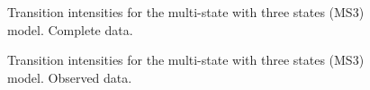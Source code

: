  \begin{figure}[h!]
\centering

\caption{Transition intensities for the multi-state with three states (MS3) model. Complete data.}
\label{fig:trans_complete}
\end{figure}

 \begin{figure}[h!]
\centering

\caption{Transition intensities for the multi-state with three states (MS3) model. Observed data.}
\label{fig:trans_observed}
\end{figure}




